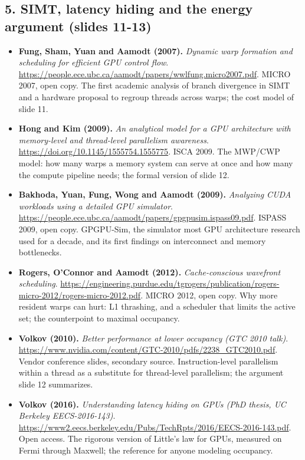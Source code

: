 \documentclass[11pt,letterpaper]{article}
\begin{document}
\subsection*{5. SIMT, latency hiding and the energy argument (slides 11-13)}
\begin{itemize}[leftmargin=1.2em,itemsep=3pt]\sloppy
\item \textbf{Fung, Sham, Yuan and Aamodt (2007).} \textit{Dynamic warp formation and scheduling for efficient GPU control flow}. \url{https://people.ece.ubc.ca/aamodt/papers/wwlfung.micro2007.pdf}. MICRO 2007, open copy. The first academic analysis of branch divergence in SIMT and a hardware proposal to regroup threads across warps; the cost model of slide 11.
\item \textbf{Hong and Kim (2009).} \textit{An analytical model for a GPU architecture with memory-level and thread-level parallelism awareness}. \url{https://doi.org/10.1145/1555754.1555775}. ISCA 2009. The MWP/CWP model: how many warps a memory system can serve at once and how many the compute pipeline needs; the formal version of slide 12.
\item \textbf{Bakhoda, Yuan, Fung, Wong and Aamodt (2009).} \textit{Analyzing CUDA workloads using a detailed GPU simulator}. \url{https://people.ece.ubc.ca/aamodt/papers/gpgpusim.ispass09.pdf}. ISPASS 2009, open copy. GPGPU-Sim, the simulator most GPU architecture research used for a decade, and its first findings on interconnect and memory bottlenecks.
\item \textbf{Rogers, O'Connor and Aamodt (2012).} \textit{Cache-conscious wavefront scheduling}. \url{https://engineering.purdue.edu/tgrogers/publication/rogers-micro-2012/rogers-micro-2012.pdf}. MICRO 2012, open copy. Why more resident warps can hurt: L1 thrashing, and a scheduler that limits the active set; the counterpoint to maximal occupancy.
\item \textbf{Volkov (2010).} \textit{Better performance at lower occupancy (GTC 2010 talk)}. \url{https://www.nvidia.com/content/GTC-2010/pdfs/2238_GTC2010.pdf}. Vendor conference slides, secondary source. Instruction-level parallelism within a thread as a substitute for thread-level parallelism; the argument slide 12 summarizes.
\item \textbf{Volkov (2016).} \textit{Understanding latency hiding on GPUs (PhD thesis, UC Berkeley EECS-2016-143)}. \url{https://www2.eecs.berkeley.edu/Pubs/TechRpts/2016/EECS-2016-143.pdf}. Open access. The rigorous version of Little's law for GPUs, measured on Fermi through Maxwell; the reference for anyone modeling occupancy.

\end{itemize}
\end{document}
